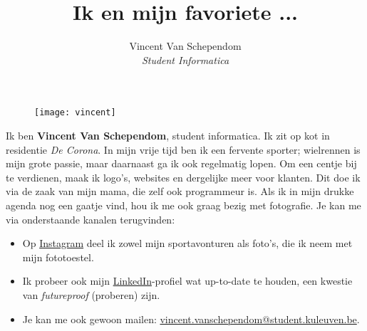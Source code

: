 \documentclass{article}
\title{Ik en mijn favoriete ...}
\author{Vincent Van Schependom
	\\ \textit{Student Informatica}}
\date{}
\begin{document}
	
	\maketitle
	
	\begin{figure}[h]
		\centering
		\texttt{[image: vincent]}
	\end{figure}
	
	Ik ben \textbf{Vincent Van Schependom}, student informatica. Ik zit op kot in residentie \textit{De Corona}. In mijn vrije tijd ben ik een fervente sporter; wielrennen is mijn grote passie, maar daarnaast ga ik ook regelmatig lopen. Om een centje bij te verdienen, maak ik logo's, websites en dergelijke meer voor klanten. Dit doe ik via de zaak van mijn mama, die zelf ook programmeur is. Als ik in mijn drukke agenda nog een gaatje vind, hou ik me ook graag bezig met fotografie. Je kan me via onderstaande kanalen terugvinden:
	
	\begin{itemize}
		\item Op \href{https://instagram.com/schependom}{Instagram} deel ik zowel mijn sportavonturen als foto's, die ik neem met mijn fototoestel.
		\item Ik probeer ook mijn \href{https://www.linkedin.com/in/vanschependom/}{LinkedIn}-profiel wat up-to-date te houden, een kwestie van \textit{futureproof} (proberen) zijn.
		\item Je kan me ook gewoon mailen: \href{mailto:vincent.vanschependom@student.kuleuven.be}{vincent.vanschependom@student.kuleuven.be}.
	\end{itemize}
	
\end{document}
